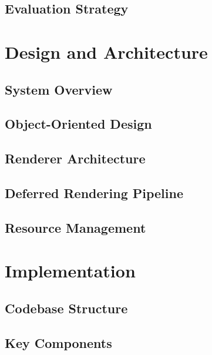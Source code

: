 \documentclass[12pt,a4paper,openright,twoside]{book}
\begin{document}
\section{Evaluation Strategy}

\chapter{Design and Architecture}
\label{chap:design}

\section{System Overview}

\section{Object-Oriented Design}

\section{Renderer Architecture}

\section{Deferred Rendering Pipeline}

\section{Resource Management}

\chapter{Implementation}
\label{chap:implementation}

\section{Codebase Structure}

\section{Key Components}
\end{document}
